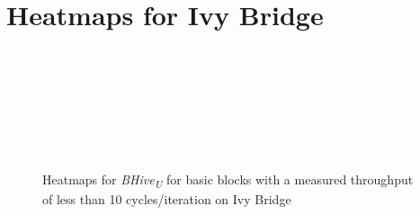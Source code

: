 \documentclass[sigconf,nonacm]{acmart}
\newcommand{\bhiveu}{\emph{BHive\textsubscript{U}}\xspace}
\begin{document}
\section{Heatmaps for Ivy Bridge}
\vfill
\begin{figure}[H]
\centering
\begin{subfigure}[t]{0.33\textwidth}\end{subfigure}~
\begin{subfigure}[t]{0.33\textwidth}\end{subfigure}~
\begin{subfigure}[t]{0.33\textwidth}\end{subfigure}\par\bigskip

\begin{subfigure}[t]{0.33\textwidth}\end{subfigure}~
\begin{subfigure}[t]{0.33\textwidth}\end{subfigure}~
\begin{subfigure}[t]{0.33\textwidth}\end{subfigure}\par\bigskip

\begin{subfigure}[t]{0.33\textwidth}\end{subfigure}
\caption{Heatmaps for \bhiveu for basic blocks with a measured throughput of less than 10 cycles/iteration on Ivy Bridge}
\end{figure}
\vfill
\end{document}
